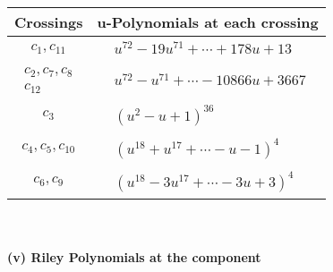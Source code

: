 \documentclass[1p]{elsarticle_modified}
\theoremstyle{definition}
\begin{document}
\begin{tabular}{m{50pt}|m{274pt}}
Crossings & \hspace{64pt}u-Polynomials at each crossing \\
\hline $$\begin{aligned}c_{1},c_{11}\end{aligned}$$&$\begin{aligned}
&u^{72}-19 u^{71}+\cdots+178 u+13
\end{aligned}$\\
\hline $$\begin{aligned}c_{2},c_{7},c_{8}\\c_{12}\end{aligned}$$&$\begin{aligned}
&u^{72}- u^{71}+\cdots-10866 u+3667
\end{aligned}$\\
\hline $$\begin{aligned}c_{3}\end{aligned}$$&$\begin{aligned}
&(u^2- u+1)^{36}
\end{aligned}$\\
\hline $$\begin{aligned}c_{4},c_{5},c_{10}\end{aligned}$$&$\begin{aligned}
&(u^{18}+u^{17}+\cdots- u-1)^{4}
\end{aligned}$\\
\hline $$\begin{aligned}c_{6},c_{9}\end{aligned}$$&$\begin{aligned}
&(u^{18}-3 u^{17}+\cdots-3 u+3)^{4}
\end{aligned}$\\
\hline
\end{tabular}\\~\\
\newpage\renewcommand{\arraystretch}{1}
\flushleft \textbf{(v) Riley Polynomials at the component}\newline \\
\end{document}
